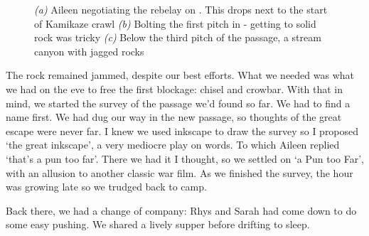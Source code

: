 \begin{figure}[t!]
\checkoddpage \ifoddpage \forcerectofloat \else \forceversofloat \fi
\centering
    \begin{subfigure}[t]{0.316\textwidth}
        \centering
        \caption{} \label{Bolting a Pun Too Far}
    \end{subfigure}
\hfill    
\begin{subfigure}[t]{0.674\textwidth}
    \centering
        \caption{} \label{fig:pun_too_far_canyon}
    \end{subfigure}
    \begin{subfigure}[t]{\textwidth}
\centering
{}
 \caption{}\label{milka pitch}
\end{subfigure}
    \caption{
    \emph{(a)} Aileen negotiating the rebelay on \protect{}. This drops next to the start of Kamikaze crawl
    \emph{(b)} Bolting the first pitch in \protect{} - getting to solid rock was tricky
    \emph{(c)} Below the third pitch of the passage, a stream canyon with jagged rocks }
\end{figure}

The rock remained jammed, despite our best efforts. What we needed was what we had on the eve to free the first blockage: chisel and crowbar. With that in mind, we started the survey of the passage we'd found so far. We had to find a name first. We had dug our way in the new passage, so thoughts of the great escape were never far. I knew we used inkscape to draw the survey so I proposed `the great inkscape', a very mediocre play on words. To which Aileen replied `that's a pun too far'. There we had it I thought, so we settled on `a Pun too Far', with an allusion to another classic war film. As we finished the survey, the hour was growing late so we trudged back to camp.

Back there, we had a change of company: Rhys and Sarah had come down to do some easy pushing. We shared a lively supper before drifting to sleep.


